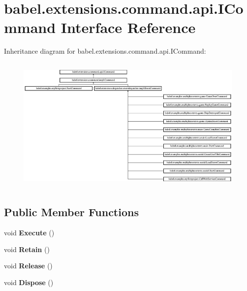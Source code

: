\hypertarget{interfacebabel_1_1extensions_1_1command_1_1api_1_1_i_command}{\section{babel.\-extensions.\-command.\-api.\-I\-Command Interface Reference}
\label{interfacebabel_1_1extensions_1_1command_1_1api_1_1_i_command}
}
Inheritance diagram for babel.\-extensions.\-command.\-api.\-I\-Command\-:\begin{figure}[H]
\begin{center}
\leavevmode
\includegraphics[height=6.735395cm]{interfacebabel_1_1extensions_1_1command_1_1api_1_1_i_command}
\end{center}
\end{figure}
\subsection*{Public Member Functions}
\begin{DoxyCompactItemize}
\item 
\hypertarget{interfacebabel_1_1extensions_1_1command_1_1api_1_1_i_command_afbf19835843cdc4c5c6fea7d2938fa87}{void {\bfseries Execute} ()}\label{interfacebabel_1_1extensions_1_1command_1_1api_1_1_i_command_afbf19835843cdc4c5c6fea7d2938fa87}

\item 
\hypertarget{interfacebabel_1_1extensions_1_1command_1_1api_1_1_i_command_a345704150125e550b485a6025680f7a8}{void {\bfseries Retain} ()}\label{interfacebabel_1_1extensions_1_1command_1_1api_1_1_i_command_a345704150125e550b485a6025680f7a8}

\item 
\hypertarget{interfacebabel_1_1extensions_1_1command_1_1api_1_1_i_command_a67a5dff04956985235b9fe4921288e78}{void {\bfseries Release} ()}\label{interfacebabel_1_1extensions_1_1command_1_1api_1_1_i_command_a67a5dff04956985235b9fe4921288e78}

\item 
\hypertarget{interfacebabel_1_1extensions_1_1command_1_1api_1_1_i_command_a156dbd2fd206e25a06fdb4a5a363867f}{void {\bfseries Dispose} ()}\label{interfacebabel_1_1extensions_1_1command_1_1api_1_1_i_command_a156dbd2fd206e25a06fdb4a5a363867f}

\end{DoxyCompactItemize}
